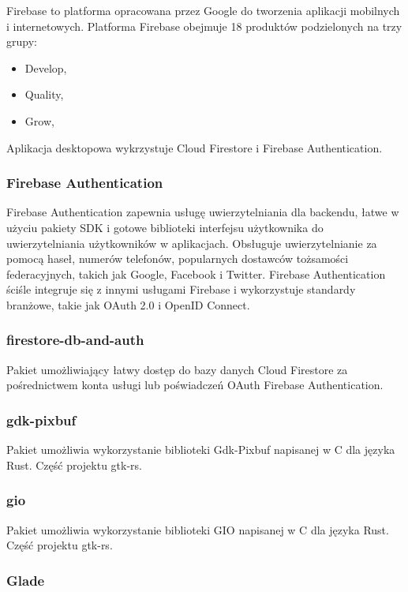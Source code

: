 \documentclass[12pt,a4paper]{article}
\begin{document}
					\indent Firebase to platforma opracowana przez Google do tworzenia aplikacji mobilnych i internetowych. Platforma Firebase obejmuje 18 produktów podzielonych
					na trzy grupy:
					\begin{itemize}
						\item Develop,
						\item Quality,
						\item Grow,
					\end{itemize}
					Aplikacja desktopowa wykrzystuje Cloud Firestore i Firebase Authentication.
				\subsubsection{Firebase Authentication}

					\indent	Firebase Authentication zapewnia usługę uwierzytelniania dla backendu, łatwe w użyciu pakiety SDK i gotowe biblioteki interfejsu użytkownika
					do uwierzytelniania użytkowników w aplikacjach. Obsługuje uwierzytelnianie za pomocą haseł, numerów telefonów, popularnych dostawców tożsamości
					federacyjnych, takich jak Google, Facebook i Twitter. Firebase Authentication ściśle integruje się z innymi usługami Firebase i wykorzystuje standardy
					branżowe, takie jak OAuth 2.0 i OpenID Connect.								
				\subsubsection{firestore-db-and-auth}

					\indent Pakiet umożliwiający łatwy dostęp do bazy danych Cloud Firestore za pośrednictwem konta usługi lub poświadczeń OAuth Firebase Authentication.				
				\subsubsection{gdk-pixbuf}

					\indent Pakiet umożliwia wykorzystanie biblioteki Gdk-Pixbuf napisanej w C dla języka Rust. Część projektu gtk-rs.
				\subsubsection{gio}

					\indent Pakiet umożliwia wykorzystanie biblioteki GIO napisanej w C dla języka Rust. Część projektu gtk-rs.
				\subsubsection{Glade}
\end{document}
